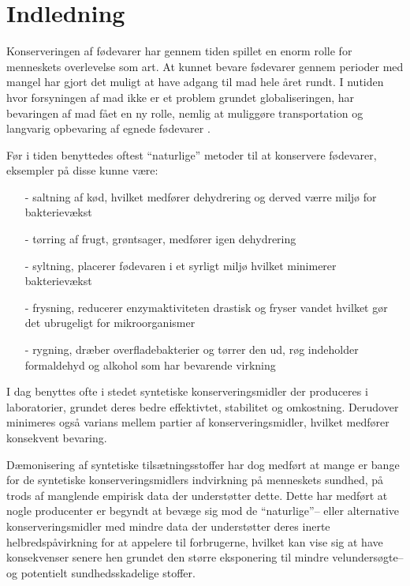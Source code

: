 \section{Indledning}
    Konserveringen af fødevarer har gennem tiden spillet en enorm rolle for menneskets overlevelse som art. At kunnet bevare fødevarer gennem perioder med mangel har gjort det muligt at have adgang til mad hele året rundt. I nutiden hvor forsyningen af mad ikke er et problem grundet globaliseringen, har bevaringen af mad fået en ny rolle, nemlig at muliggøre transportation og langvarig opbevaring af egnede fødevarer \parencite{Elis2019}.

    Før i tiden benyttedes oftest ``naturlige'' metoder til at konservere fødevarer, eksempler på disse kunne være: 
    \begin{itemize}
        \item[-] saltning af kød, hvilket medfører dehydrering og derved værre miljø for bakterievækst
        \item[-] tørring af frugt, grøntsager, medfører igen dehydrering
        \item[-] syltning, placerer fødevaren i et syrligt miljø hvilket minimerer bakterievækst
        \item[-] frysning, reducerer enzymaktiviteten drastisk og fryser vandet hvilket gør det ubrugeligt for mikroorganismer
        \item[-] rygning, dræber overfladebakterier og tørrer den ud, røg indeholder formaldehyd og alkohol som har bevarende virkning
    \end{itemize}
    I dag benyttes ofte i stedet syntetiske konserveringsmidler der produceres i laboratorier, grundet deres bedre effektivtet, stabilitet og omkostning. Derudover minimeres også varians mellem partier af konserveringsmidler, hvilket medfører konsekvent bevaring.

    Dæmonisering af syntetiske tilsætningsstoffer har dog medført at mange er bange for de syntetiske konserveringsmidlers indvirkning på menneskets sundhed, på trods af manglende empirisk data der understøtter dette. Dette har medført at nogle producenter er begyndt at bevæge sig mod de ``naturlige''-- eller alternative konserveringsmidler med mindre data der understøtter deres inerte helbredspåvirkning for at appelere til forbrugerne, hvilket kan vise sig at have konsekvenser senere hen grundet den større eksponering til mindre velundersøgte-- og potentielt sundhedsskadelige stoffer.

